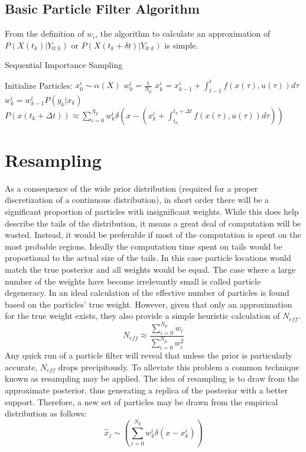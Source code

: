 \subsection{Basic Particle Filter Algorithm}
From the definition of $w_i$, the algorithm to calculate
an approximation of $P(X(t_k) | Y_{0:k})$ or $P(X(t_k + \delta t) | Y_{0:k})$
is simple.

\begin{algorithm}
\caption{Sequential Importance Sampling}
\begin{algorithmic}
\STATE Initialize Particles:
    \STATE $x^i_0  \sim \alpha(X)$
    \STATE $w^i_0 = \frac{1}{N_p}$
\ENDFOR
{}
        \STATE $x^i_k = x^i_{k-1} + \int_{t-1}^t f(x(\tau), u(\tau)) d\tau $
        \STATE $w^i_k = w^i_{k-1}P(y_k | x_k)$
    \ENDFOR
\ENDFOR
\STATE $P(x(t_k+\Delta t)) \approx 
\sum_{i=0}^{N_p} w^i_k \delta\left(x - (x^i_k + \int_{t_k}^{t_k+\Delta t} f(x(\tau), u(\tau)) d\tau) \right)$
\end{algorithmic}
\end{algorithm}

\section{Resampling}
\label{sec:Particle Filter Resampling}
As a consequence 
of the wide prior distribution (required for a proper discretization of a continuous
distribution), in short order there will be a significant proportion of particles 
with insignificant weights. 
While this does help
describe the tails of the distribution, it means a great deal of computation will be wasted.
Instead, it would be preferable if most of the computation is spent on the most probable regions.
Ideally the computation time spent on tails would be proportional to the actual size of the
tails. In this case particle locations would match the true posterior and all weights would
be equal.  The case where a large number of the weights have become irrelevantly small
is called particle degeneracy. In  \cite{Liu1998b}
an ideal calculation of the effective number of particles is found based on the 
particles' true weight. However, given that only an approximation for the true weight 
exists, they also provide a simple heuristic calculation of $N_{eff}$.
\begin{equation}
N_{eff} \approx \frac{\sum_{i=0}^{N_p} w_i}{\sum_{i=0}^{N_p} w_i^2}
\label{eq:neff}
\end{equation}
Any quick run of a particle filter will reveal that unless the prior is particularly accurate,
$N_{eff}$ drops precipitously.  To alleviate this problem
a common technique known as resampling may be applied. The idea of resampling is to 
draw from the approximate posterior, thus generating a replica of the posterior with 
a better support. Therefore, a new set of particles may be drawn from the empirical
distribution as follows:
\begin{equation}
\hat{x}_j \sim \left(\sum_{i=0}^{N_p} w^i_k\delta(x - x^i_k)\right)
\end{equation}

